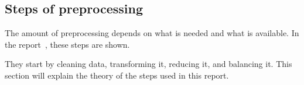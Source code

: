   
  
\subsection{Steps of preprocessing}\label{subsec:preprocessing-steps}
The amount of preprocessing depends on what is needed and what is available. In the report~\cite{Data-preprocessing-for-flight-delays}, these steps are shown. 

They start by cleaning data, transforming it, reducing it, and balancing it. This section will explain the theory of the steps used in this report.









  

  


